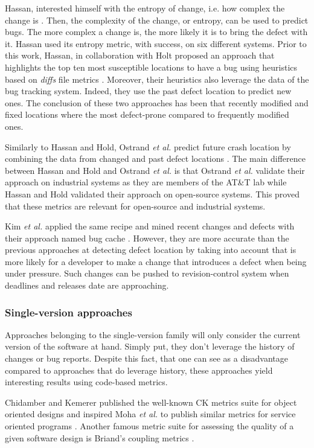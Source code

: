 Hassan, interested himself with the entropy of change, i.e. how complex the change is \cite{Hassan2009}.
Then, the complexity of the change, or entropy, can be used to predict bugs.
The more complex a change is, the more likely it is to bring the defect with it.
Hassan used its entropy metric, with success, on six different systems.
Prior to this work, Hassan, in collaboration with Holt proposed an approach that highlights the top ten most susceptible locations to have a bug using heuristics based on \textit{diffs} file metrics \cite{Hassan2005}.
Moreover, their heuristics also leverage the data of the bug tracking system.
Indeed, they use the past defect location to predict new ones.
The conclusion of these two approaches has been that recently modified and fixed locations where the most defect-prone compared to frequently modified ones.

Similarly to Hassan and Hold,  Ostrand \textit{et al.} predict future crash location by combining the data from changed and past defect locations \cite{Ostrand2005}.
The main difference between Hassan and Hold and Ostrand \textit{et al.} is that Ostrand \textit{et al.} validate their approach on industrial systems as they are members of the AT\&T lab while Hassan and Hold validated their approach on open-source systems.
This proved that these metrics are relevant for open-source and industrial systems.

Kim \textit{et al.} applied the same recipe and mined recent changes and defects with their approach named bug cache \cite{Kim2007a}.
However, they are more accurate than the previous approaches at detecting defect location by taking into account that is more likely for a developer to make a change that introduces a defect when being under pressure.
Such changes can be pushed to revision-control system when deadlines and releases date are approaching.

\subsubsection{Single-version approaches}

Approaches belonging to the single-version family will only consider the current version of the software at hand.
Simply put, they don't leverage the history of changes or bug reports.
Despite this fact, that one can see as a disadvantage compared to approaches that do leverage history, these approaches yield interesting results using code-based metrics.

Chidamber and Kemerer published the well-known CK metrics suite \cite{Chidamber1994} for object oriented designs and inspired Moha \textit{et al.} to publish similar metrics for service oriented programs \cite{Moha}.
Another famous metric suite for assessing the quality of a given software design is Briand's coupling metrics \cite{Briand1999a}.

